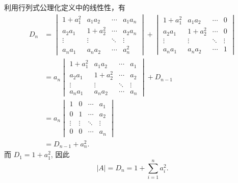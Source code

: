 \documentclass[12pt,fontset=fandol]{ctexart}
\begin{document}
\begin{solve}
            利用行列式公理化定义中的线性性，有
            \begin{align*}
                D_n &= \begin{vmatrix}
                    1+a_1^2 & a_1a_2  & \cdots & a_1a_n  \\
                    a_2a_1  & 1+a_2^2 & \cdots & a_2a_n  \\
                    \vdots  & \vdots  & \ddots & \vdots  \\
                    a_na_1  & a_na_2  & \cdots & a_n^2
                \end{vmatrix} + \begin{vmatrix}
                    1+a_1^2 & a_1a_2  & \cdots & 0       \\
                    a_2a_1  & 1+a_2^2 & \cdots & 0       \\
                    \vdots  & \vdots  & \ddots & \vdots  \\
                    a_na_1  & a_na_2  & \cdots & 1
                \end{vmatrix} \\
                &= a_n \begin{vmatrix}
                    1+a_1^2 & a_1a_2  & \cdots & a_1     \\
                    a_2a_1  & 1+a_2^2 & \cdots & a_2     \\
                    \vdots  & \vdots  & \ddots & \vdots  \\
                    a_na_1  & a_na_2  & \cdots & a_n
                \end{vmatrix} + D_{n-1} \\
                &= a_n \begin{vmatrix}
                    1      & 0      & \cdots & a_1     \\
                    0      & 1      & \cdots & a_2     \\
                    \vdots & \vdots & \ddots & \vdots  \\
                    0      & 0      & \cdots & a_n
                \end{vmatrix} \\
                &= D_{n-1} + a_n^2.
            \end{align*}
            而 $D_1 = 1 + a_1^2$, 因此
            \[
                |A| = D_n = 1 + \sum_{i=1}^n a_i^2.
            \]
\end{solve}
\end{document}

